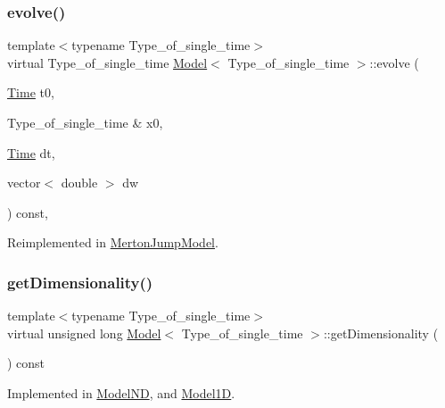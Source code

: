 \subsubsection{\texorpdfstring{evolve()}{evolve()}\hspace{0.1cm}{\footnotesize\ttfamily [2/2]}}
{\footnotesize\ttfamily template$<$typename Type\+\_\+of\+\_\+single\+\_\+time$>$ \\
virtual Type\+\_\+of\+\_\+single\+\_\+time \hyperlink{class_model}{Model}$<$ Type\+\_\+of\+\_\+single\+\_\+time $>$\+::evolve (\begin{DoxyParamCaption}\item[{\hyperlink{_name_def_8h_ac2d3e0ba793497bcca555c7c2cf64ff3}{Time}}]{t0,  }\item[{Type\+\_\+of\+\_\+single\+\_\+time \&}]{x0,  }\item[{\hyperlink{_name_def_8h_ac2d3e0ba793497bcca555c7c2cf64ff3}{Time}}]{dt,  }\item[{vector$<$ double $>$}]{dw }\end{DoxyParamCaption}) const\hspace{0.3cm}{\ttfamily [inline]}, {\ttfamily [virtual]}}



Reimplemented in \hyperlink{class_merton_jump_model_a2d3491f75435d364f6102e72b8376d81}{Merton\+Jump\+Model}.

\hypertarget{class_model_a26832ec2df24d7941783d3cd6d500898}{}\label{class_model_a26832ec2df24d7941783d3cd6d500898} 
\subsubsection{\texorpdfstring{get\+Dimensionality()}{getDimensionality()}}
{\footnotesize\ttfamily template$<$typename Type\+\_\+of\+\_\+single\+\_\+time$>$ \\
virtual unsigned long \hyperlink{class_model}{Model}$<$ Type\+\_\+of\+\_\+single\+\_\+time $>$\+::get\+Dimensionality (\begin{DoxyParamCaption}{ }\end{DoxyParamCaption}) const\hspace{0.3cm}{\ttfamily [pure virtual]}}



Implemented in \hyperlink{class_model_n_d_ab2356536a38f4961257654de629d6093}{Model\+ND}, and \hyperlink{class_model1_d_ac81875523be6153cb58d0f37914eb9a1}{Model1D}.

